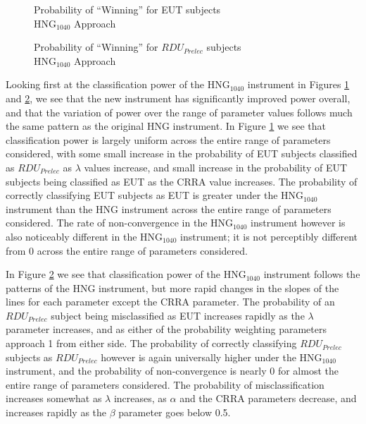 \documentclass[../main.tex]{subfiles}
\begin{document}
\begin{figure}[h!]
	\center
	\caption{Probability of \enquote{Winning} for EUT subjects\\$\text{HNG}_{1040}$ Approach}
	\label{fig:HNG_win_eut}
\end{figure}

\begin{figure}[h!]
	\center
	\caption{Probability of \enquote{Winning} for $\mathit{RDU_{Prelec}}$ subjects\\$\text{HNG}_{1040}$ Approach}
	\label{fig:HNG_win_pre}
\end{figure}

Looking first at the classification power of the $\text{HNG}_{1040}$ instrument in Figures \ref{fig:HNG_win_eut} and \ref{fig:HNG_win_pre}, we see that the new instrument has significantly improved power overall, and that the variation of power over the range of parameter values follows much the same pattern as the original HNG instrument.
In Figure \ref{fig:HNG_win_eut} we see that classification power is largely uniform across the entire range of parameters considered, with some small increase in the probability of EUT subjects classified as $\mathit{RDU_{Prelec}}$ as $\lambda$ values increase, and small increase in the probability of EUT subjects being classified as EUT as the CRRA value increases.
The probability of correctly classifying EUT subjects as EUT is greater under the $\text{HNG}_{1040}$ instrument than the HNG instrument across the entire range of parameters considered.
The rate of non-convergence in the $\text{HNG}_{1040}$ instrument however is also noticeably different in the $\text{HNG}_{1040}$ instrument; it is not perceptibly different from 0 across the entire range of parameters considered.

In Figure \ref{fig:HNG_win_pre} we see that classification power of the $\text{HNG}_{1040}$ instrument follows the patterns of the HNG instrument, but more rapid changes in the slopes of the lines for each parameter except the CRRA parameter.
The probability of an $\mathit{RDU_{Prelec}}$ subject being misclassified as EUT increases rapidly as the $\lambda$ parameter increases, and as either of the probability weighting parameters approach 1 from either side.
The probability of correctly classifying $\mathit{RDU_{Prelec}}$ subjects as $\mathit{RDU_{Prelec}}$ however is again universally higher under the $\text{HNG}_{1040}$ instrument, and the probability of non-convergence is nearly 0 for almost the entire range of parameters considered.
The probability of misclassification increases somewhat as $\lambda$ increases, as $\alpha$ and the CRRA parameters decrease, and increases rapidly as the $\beta$ parameter goes below 0.5.
\end{document}
